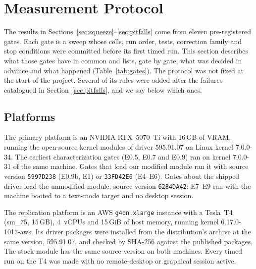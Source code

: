\section{Measurement Protocol}
\label{sec:protocol}

The results in Sections~\ref{sec:squeeze}--\ref{sec:pitfalls} come from eleven pre-registered gates. Each gate is a sweep whose cells, run order,
tests, correction family and stop conditions were committed before its
first timed run. This section describes what those gates have in common
and lists, gate by gate, what was decided in advance and what happened
(Table~\ref{tab:gates}). The protocol was not fixed at the start of the
project. Several of its rules were added after the failures catalogued
in Section~\ref{sec:pitfalls}, and we say below which ones.

\subsection{Platforms}
\label{sec:protocol:platforms}

The primary platform is an NVIDIA RTX~5070~Ti with 16\,GB of VRAM,
running the open-source kernel modules of driver 595.91.07 on Linux
kernel 7.0.0-34. The earliest characterization gates (E0.5, E0.7 and
E0.9) ran on kernel 7.0.0-31 of the same machine. Gates that load our
modified module ran it with source version \texttt{5997D238} (E0.9b,
E1) or \texttt{33FD42E6} (E4--E6). Gates about the shipped driver load
the unmodified module, source version \texttt{6284DA42}; E7--E9 ran
  with the machine booted to a text-mode target and no desktop session.

The replication platform is an AWS \texttt{g4dn.xlarge} instance with a
Tesla~T4 (sm\_75, 15\,GB), 4~vCPUs and 15\,GiB of host memory, running
kernel 6.17.0-1017-aws. Its driver packages were installed from the
distribution's archive at the same version, 595.91.07, and checked by
SHA-256 against the published packages. The stock module has the same
source version on both machines. Every timed run on the T4 was made
with no remote-desktop or graphical session active.

